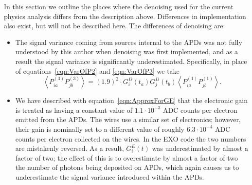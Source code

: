 In this section we outline the places where the denoising used for the current physics analysis differs from the description above.  Differences in implementation also exist, but will not be described here.  The differences of denoising are:
\begin{itemize}
\item The signal variance coming from sources internal to the APDs was not fully understood by this author when denoising was first implemented, and as a result the signal variance is significantly underestimated.  Specifically, in place of equations~\ref{eqn:VarOfP2} and \ref{eqn:VarOfP3} we take
\begin{equation}
\left< P^{(3)}_{ia} P^{(3)}_{jb} \right> = (1.9)^2 \cdot G^D_i(t_a)G^D_j(t_b) \left< P^{(1)}_{ia} P^{(1)}_{jb} \right>.
\end{equation}
\item We have described with equation~\ref{eqn:ApproxForGE} that the electronic gain is treated as having a constant value of $1.1 \cdot 10^{-3}$ ADC counts per electron emitted from the APDs.  The wires use a similar set of electronics; however, their gain is nominally set to a different value of roughly $6.3 \cdot 10^{-4}$ ADC counts per electron collected on the wires. In the EXO code the two numbers are mistakenly reversed.  As a result, $G^E_i(t)$ was underestimated by almost a factor of two; the effect of this is to overestimate by almost a factor of two the number of photons being deposited on APDs, which again causes us to underestimate the signal variance introduced within the APDs.
\end{itemize}

